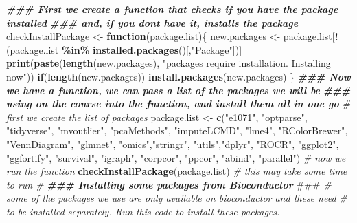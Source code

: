 \documentclass[
]{book}
\newenvironment{Shaded}{\begin{snugshade}}{\end{snugshade}}
\newcommand{\AlertTok}[1]{\textcolor[rgb]{0.94,0.16,0.16}{#1}}
\newcommand{\CommentTok}[1]{\textcolor[rgb]{0.56,0.35,0.01}{\textit{#1}}}
\newcommand{\ControlFlowTok}[1]{\textcolor[rgb]{0.13,0.29,0.53}{\textbf{#1}}}
\newcommand{\DocumentationTok}[1]{\textcolor[rgb]{0.56,0.35,0.01}{\textbf{\textit{#1}}}}
\newcommand{\FunctionTok}[1]{\textcolor[rgb]{0.13,0.29,0.53}{\textbf{#1}}}
\newcommand{\NormalTok}[1]{#1}
\newcommand{\OtherTok}[1]{\textcolor[rgb]{0.56,0.35,0.01}{#1}}
\newcommand{\SpecialCharTok}[1]{\textcolor[rgb]{0.81,0.36,0.00}{\textbf{#1}}}
\newcommand{\StringTok}[1]{\textcolor[rgb]{0.31,0.60,0.02}{#1}}
\begin{document}
\begin{Shaded}
\begin{Highlighting}[]
\DocumentationTok{\#\#\# First we create a function that checks if you have the package installed }
    \DocumentationTok{\#\#\# and, if you don\textquotesingle{}t have it, installs the package}
\NormalTok{    checkInstallPackage }\OtherTok{\textless{}{-}} \ControlFlowTok{function}\NormalTok{(package.list)\{}
\NormalTok{      new.packages }\OtherTok{\textless{}{-}}\NormalTok{ package.list[}\SpecialCharTok{!}\NormalTok{(package.list }\SpecialCharTok{\%in\%} \FunctionTok{installed.packages}\NormalTok{()[,}\StringTok{"Package"}\NormalTok{])]}
      \FunctionTok{print}\NormalTok{(}\FunctionTok{paste}\NormalTok{(}\FunctionTok{length}\NormalTok{(new.packages), }\StringTok{"packages require installation. Installing now"}\NormalTok{))}
      \ControlFlowTok{if}\NormalTok{(}\FunctionTok{length}\NormalTok{(new.packages)) }\FunctionTok{install.packages}\NormalTok{(new.packages)}
\NormalTok{    \}}
    \DocumentationTok{\#\#\# Now we have a function, we can pass a list of the packages we will be }
    \DocumentationTok{\#\#\# using on the course into the function, and install them all in one go}
    \CommentTok{\# first we create the list of packages}
\NormalTok{    package.list }\OtherTok{\textless{}{-}} \FunctionTok{c}\NormalTok{(}\StringTok{"e1071"}\NormalTok{, }\StringTok{"optparse"}\NormalTok{, }\StringTok{"tidyverse"}\NormalTok{, }\StringTok{"mvoutlier"}\NormalTok{, }\StringTok{"pcaMethods"}\NormalTok{,}
                \StringTok{"imputeLCMD"}\NormalTok{, }\StringTok{"lme4"}\NormalTok{, }\StringTok{"RColorBrewer"}\NormalTok{, }\StringTok{"VennDiagram"}\NormalTok{, }\StringTok{"glmnet"}\NormalTok{, }\StringTok{"omics"}\NormalTok{,}\StringTok{"stringr"}\NormalTok{,}
                \StringTok{"utils"}\NormalTok{,}\StringTok{"dplyr"}\NormalTok{, }\StringTok{"ROCR"}\NormalTok{, }\StringTok{"ggplot2"}\NormalTok{, }\StringTok{"ggfortify"}\NormalTok{, }\StringTok{"survival"}\NormalTok{, }\StringTok{"igraph"}\NormalTok{, }\StringTok{"corpcor"}\NormalTok{,}
                \StringTok{"ppcor"}\NormalTok{, }\StringTok{"abind"}\NormalTok{, }\StringTok{"parallel"}\NormalTok{)}
    \CommentTok{\# now we run the function}
    \FunctionTok{checkInstallPackage}\NormalTok{(package.list)}
    \CommentTok{\# this may take some time to run \#}
    \DocumentationTok{\#\#\# Installing some packages from Bioconductor }\AlertTok{\#\#\#}
    \CommentTok{\# some of the packages we use are only available on bioconductor and these need }
    \CommentTok{\# to be installed separately. Run this code to install these packages.}

\end{Highlighting}
\end{Shaded}
\end{document}
